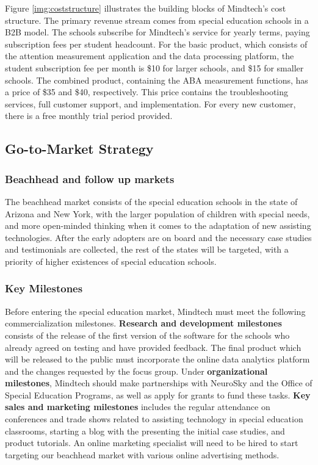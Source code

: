 \documentclass[letterpaper,10pt]{article}
\let\oldsubsection\subsection
\renewcommand{\subsection}{\def\cursectioning{subsection}\oldsubsection}
\begin{document}
Figure \ref{img:coststructure} illustrates the building blocks of Mindtech's cost structure. The primary revenue stream comes from special education schools in a B2B model. The schools subscribe for Mindtech’s service for yearly terms, paying subscription fees per student headcount. For the basic product, which consists of the attention measurement application and the data processing platform, the student subscription fee per month is \$10 for larger schools, and \$15 for smaller schools. The combined product, containing the ABA measurement functions, has a price of \$35 and \$40, respectively. This price contains the troubleshooting services, full customer support, and implementation. For every new customer, there is a free monthly trial period provided.

\subsection{Go-to-Market Strategy}
\subsubsection{Beachhead and follow up markets}

The beachhead market consists of the special education schools in the state of Arizona and New York, with the larger population of children with special needs, and more open-minded thinking when it comes to the adaptation of new assisting technologies. After the early adopters are on board and the necessary case studies and testimonials are collected, the rest of the states will be targeted, with a priority of higher existences of special education schools.

\subsubsection{Key Milestones}

Before entering the special education market, Mindtech must meet the following commercialization milestones. \textbf{Research and development milestones} consists of the release of the first version of the software for the schools who already agreed on testing and have provided feedback. The final product which will be released to the public must incorporate the online data analytics platform and the changes requested by the focus group. Under \textbf{organizational milestones}, Mindtech should make partnerships with NeuroSky and the Office of Special Education Programs, as well as apply for grants to fund these tasks. \textbf{Key sales and marketing milestones} includes the regular attendance on conferences and trade shows related to assisting technology in special education classrooms, starting a blog with the presenting the initial case studies, and product tutorials. An online marketing specialist will need to be hired to start targeting our beachhead market with various online advertising methods.
\end{document}

